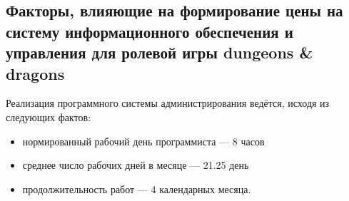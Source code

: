\subsection{Факторы, влияющие на формирование цены на систему информационного обеспечения и управления для ролевой игры dungeons & dragons}
Реализация программного системы администрирования ведётся, исходя из
следующих фактов:
\begin{itemize}
\item нормированный рабочий день программиста --– 8 часов
\item среднее число рабочих дней в месяце –-- 21.25 день
\item продолжительность работ --- 4 календарных месяца.
\end{itemize}


